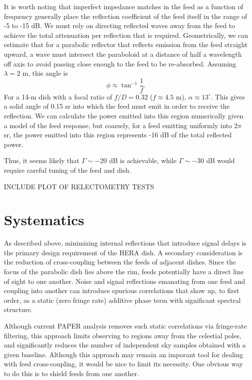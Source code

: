 \documentclass[11pt]{article}
\begin{document}
It is worth noting that imperfect impedance matches in the feed as a function
of frequency generally place the reflection coefficient of the feed itself
in the range of -5 to -15 dB. We must rely on directing reflected
waves away from the feed to achieve the total attenuation per reflection
that is required.  Geometrically, we can estimate that for a parabolic reflector that
reflects emission from the feed straight upward, a wave must intersect the paraboloid
at a distance of half a wavelength off axis to avoid
passing close enough to the feed to be re-absorbed.  Assuming $\lambda=2$ m, this angle is 
\begin{equation}
\phi\approx\tan^{-1}\frac{1}{f}.
\end{equation}
For a 14-m dish with a focal ratio of $f/D=0.32$ ($f\approx4.5$ m), $\alpha\approx13^\circ$.
This gives a solid angle of 0.15 sr into which the feed must emit in order to receive the reflection.
We can calculate the power emitted into this region numerically given a model of the feed response,
but coarsely, for a feed emitting uniformly into $2\pi$ sr, the power emitted into this region
represents -16 dB of the total reflected power.  

Thus, it seems likely that $\Gamma\sim-20$ dB is achievable, while $\Gamma\sim-30$ dB
would require careful tuning of the feed and dish.

INCLUDE PLOT OF RELECTOMETRY TESTS

\section{Systematics}

As described above, minimizing internal reflections that introduce signal delays is
the primary design requirement of the HERA dish.  A secondary consideration is the
reduction of cross-coupling between the feeds of adjacent dishes.  Since the focus of
the parabolic dish lies above the rim, feeds potentially have a direct line of sight to
one another.  Noise and signal reflections emanating from one feed and coupling into another
can introduce spurious correlations that show up, to first order, as a static (zero fringe rate) additive
phase term with significant spectral structure.  

Although current PAPER analysis removes such static correlations via fringe-rate filtering, this
approach limits observing to regions away from the celestial poles, and significantly reduces the number
of independent sky samples obtained with a given baseline.  Although this approach may remain an
imporant tool for dealing with feed cross-coupling, it would be nice to limit its necessity.
One obvious way to do this is to shield feeds from one another.
\end{document}
